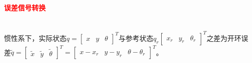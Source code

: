 \documentclass[
12pt, %
a4paper, 
oneside, %
]{scrartcl}
\begin{document}
\paragraph{\textcolor{red}{误差信号转换}}~\\

惯性系下，实际状态$ q = \begin{bmatrix} x & y & \theta \end{bmatrix}^T $与参考状态$ q_r \begin{bmatrix} x_r & y_r & \theta_r \end{bmatrix}^T $之差为开环误差$ \tilde{q} = \begin{bmatrix} \tilde{x} & \tilde{y} & \tilde{\theta} \end{bmatrix}^T = \begin{bmatrix} x - x_r & y - y_r & \theta - \theta_r \end{bmatrix}^T $。
\end{document}
